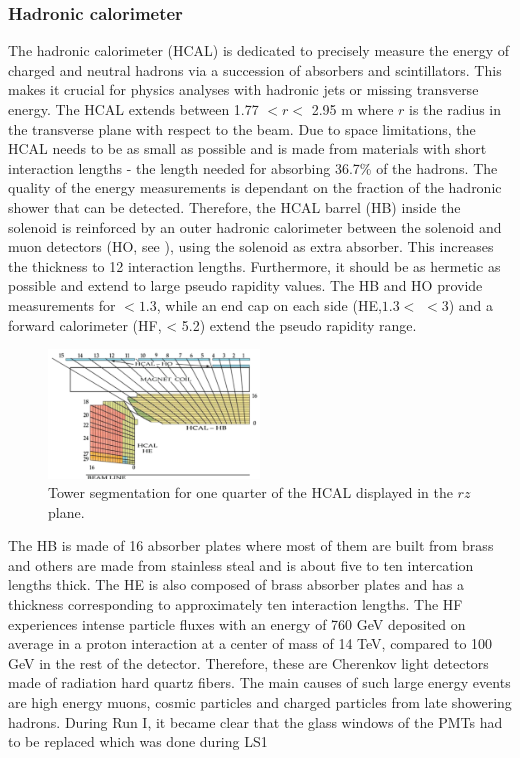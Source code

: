\subsubsection{Hadronic calorimeter}
The hadronic calorimeter (HCAL) is dedicated to precisely measure the energy of charged and neutral hadrons via a succession of absorbers and scintillators. This makes it crucial for physics analyses with hadronic jets or missing transverse energy. The HCAL extends between 1.77 $<r<$ 2.95 \si{ \meter} where $r$ is the radius in the transverse plane with respect to the beam. Due to space limitations, the HCAL needs to be as small as possible and is made from materials with short interaction lengths - the length needed for absorbing 36.7\% of the hadrons. The quality of the energy measurements is dependant on the fraction of the hadronic shower that can be detected. Therefore, the HCAL barrel (HB) inside the solenoid is reinforced by an outer hadronic calorimeter between the solenoid and muon detectors (HO, see ), using the solenoid as extra absorber. This increases the thickness to 12 interaction lengths. Furthermore, it should be as hermetic as possible and extend to large pseudo rapidity values. The HB and HO provide measurements for \abspsrap $<1.3$, while an end cap on each side (HE,$1.3<$ \abspsrap $<3$) and a forward calorimeter (HF, \abspsrap < 5.2) extend the pseudo rapidity range. 


\begin{figure}[ht]
	\centering
	\includegraphics[width=0.5\textwidth]{2_ExperimentalSetup/Figures/imageedit_12_3242046754}
	\caption{Tower segmentation for one quarter of the HCAL displayed in the $rz$ plane\cite{Chatrchyan:2008aa}.}
	\label{fig:HCAL}
\end{figure}

The HB is made of 16 absorber plates where most of them are built from brass and others are made from stainless steal and is about five to ten intercation lengths thick. The HE is also composed of brass absorber plates and has a thickness corresponding to approximately ten interaction lengths. 
The HF experiences intense particle fluxes with an energy of 760 \si{ \GeV} deposited on average in a proton interaction at a center of mass of 14 \si{ \TeV}, compared to 100 \si{ \GeV} in the rest of the detector. Therefore, these are Cherenkov light detectors made of radiation hard quartz fibers.
The main causes of such large energy events are high energy muons, cosmic particles and charged particles from late showering hadrons. During  Run I, it became clear that the glass windows of the PMTs had to be replaced which was done during LS1 \cite{Tiras:2016ghv}
	
